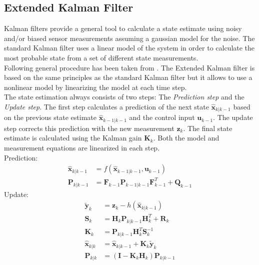 \subsection{Extended Kalman Filter}
Kalman filters provide a general tool to calculate a state estimate using noisy and/or biased sensor measurements assuming a gaussian model for the noise. The standard Kalman filter uses a linear model of the system in order to calculate the most probable state from a set of different state measurements.\\
Following general procedure has been taken from \cite{Bar-Shalom}.
The Extended Kalman filter is based on the same principles as the standard Kalman filter but it allows to use a nonlinear model by linearizing the model at each time step.\\
The state estimation always consists of two steps: The \emph{Prediction step} and the \emph{Update step}. The first step calculates a prediction of the next state $\hat{\bm{x}}_{k|k-1}$ based on the previous state estimate $\hat{\bm{x}}_{k-1|k-1}$ and the control input $\bm{u}_{k-1}$. The update step corrects this prediction with the new measurement $\bm{z}_k$. The final state estimate is calculated using the Kalman gain $\bm{K}_k$. Both the model and measurement equations are linearized in each step.\\
Prediction:
\begin{subequations}
\begin{align}
\hat{\bm{x}}_{k|k-1} &= f(\hat{\bm{x}}_{k-1|k-1},\bm{u}_{k-1})\\
\bm{P}_{k|k-1} &= \bm{F}_{k-1} \bm{P}_{k-1|k-1} \bm{F}_{k-1}^T + \bm{Q}_{k-1}
\end{align}
\end{subequations}
Update:
\begin{subequations}
\begin{align}
\tilde{\bm{y}}_k &= \bm{z}_k - h(\hat{\bm{x}}_{k|k-1})\\
\bm{S}_k &= \bm{H}_k \bm{P}_{k|k-1} \bm{H}_k^T + \bm{R}_k\\
\bm{K}_k &= \bm{P}_{k|k-1}\bm{H}_k^T \bm{S}_k^{-1}\\
\hat{\bm{x}}_{k|k} &= \hat{\bm{x}}_{k|k-1} + \bm{K}_k \tilde{\bm{y}}_k\\
\bm{P}_{k|k} &= (\bm{I}-\bm{K}_k \bm{H}_k)\bm{P}_{k|k-1}
\end{align}
\end{subequations}

